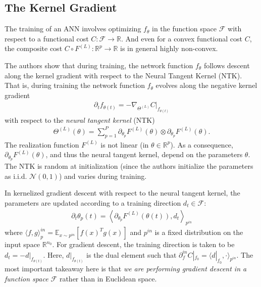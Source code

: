 \documentclass{article}
\begin{document}
\subsection{The Kernel Gradient}
The training of an ANN involves optimizing $f_{\theta}$ in the function space $\mathcal{F}$ with respect to a functional cost $C: \mathcal{F} \rightarrow \mathbb{R}$. And even for a convex functional cost $C$, the composite cost $C \circ F^{(L)}: \mathbb{R}^p \rightarrow \mathbb{R}$ is in general highly non-convex. 

The authors show that during training, the network function $f_{\theta}$ follows descent along the kernel gradient with respect to the Neural Tangent Kernel (NTK). That is, during training the network function $f_{\theta}$ evolves along the negative kernel gradient
\begin{align*}
    \partial_t f_{\theta(t)} = - \nabla_{\Theta^{(L)}} C|_{f_{\theta(t)}}
\end{align*}
with respect to the \textit{neural tangent kernel} (NTK)
\begin{align*}
    \Theta^{(L)}(\theta) = \sum_{p=1}^P \partial_{\theta_p} F^{(L)}(\theta) \otimes \partial_{\theta_p} F^{(L)}(\theta).
\end{align*}
The realization function $F^{(L)}$ is not linear (in $\theta \in \mathbb{R}^p$). As a consequence, $\partial_{\theta_p} F^{(L)}(\theta)$, and thus the neural tangent kernel, depend on the parameters $\theta$. The NTK is random at initialization (since the authors initialize the parameters as i.i.d. $\mathcal{N}(0,1)$) and varies during training. 

In kernelized gradient descent with respect to the neural tangent kernel, the parameters are updated according to a training direction $d_t \in \mathcal{F}$:
\begin{align*}
    \partial_t \theta_p(t) =  \left \langle \partial_{\theta_p} F^{(L)}(\theta(t)), d_t \right\rangle_{p^{in}}
\end{align*}
where $\langle f, g \rangle_p^{in} = \mathbb{E}_{x \sim p^{in}} [f(x)^T g(x) ]$ and $p^{in}$ is a fixed distribution on the input space $\mathbb{R}^{n_0}$. For gradient descent, the training direction is taken to be $d_t = -d|_{f_{\theta(t)}}$. Here, $d|_{f_{\theta(t)}}$ is the dual element such that $\partial_f^{in} C|_{f_0} = \langle d|_{f_0}, \cdot \rangle_{p^{in}}$. The most important takeaway here is that \textit{we are performing gradient descent in a function space $\mathcal{F}$} rather than in Euclidean space.
\end{document}
